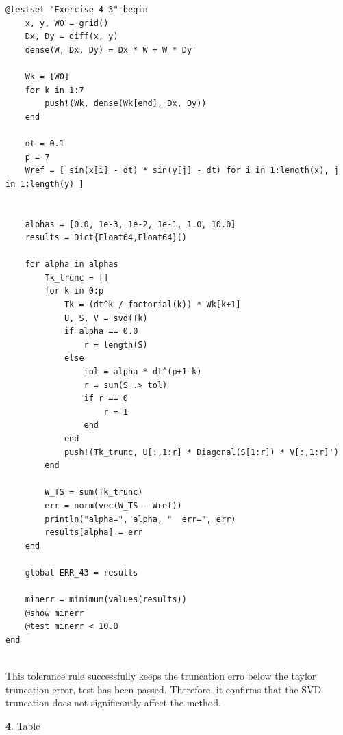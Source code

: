 \documentclass[11pt]{article}
\begin{document}
\begin{lstlisting}
@testset "Exercise 4-3" begin
    x, y, W0 = grid()
    Dx, Dy = diff(x, y)
    dense(W, Dx, Dy) = Dx * W + W * Dy'

    Wk = [W0]
    for k in 1:7
        push!(Wk, dense(Wk[end], Dx, Dy))
    end

    dt = 0.1
    p = 7
    Wref = [ sin(x[i] - dt) * sin(y[j] - dt) for i in 1:length(x), j in 1:length(y) ]


    alphas = [0.0, 1e-3, 1e-2, 1e-1, 1.0, 10.0]
    results = Dict{Float64,Float64}()

    for alpha in alphas
        Tk_trunc = []
        for k in 0:p
            Tk = (dt^k / factorial(k)) * Wk[k+1]
            U, S, V = svd(Tk)
            if alpha == 0.0
                r = length(S)
            else
                tol = alpha * dt^(p+1-k)
                r = sum(S .> tol)
                if r == 0
                    r = 1
                end
            end
            push!(Tk_trunc, U[:,1:r] * Diagonal(S[1:r]) * V[:,1:r]')
        end

        W_TS = sum(Tk_trunc)
        err = norm(vec(W_TS - Wref))
        println("alpha=", alpha, "  err=", err)
        results[alpha] = err
    end

    global ERR_43 = results
    
    minerr = minimum(values(results))
    @show minerr
    @test minerr < 10.0
end
  
\end{lstlisting}
This tolerance rule successfully keeps the truncation erro below the taylor truncation error, test has been passed. Therefore, it confirms that the SVD truncation does not significantly affect the method.

\vspace{1.5em}
\textbf{4}. Table
\end{document}
